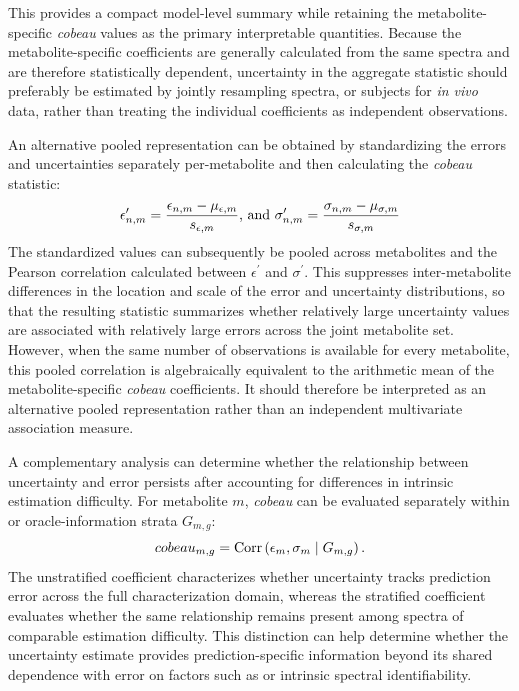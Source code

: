 This provides a compact model-level summary while retaining the metabolite-specific \textit{cobeau} values as the primary interpretable quantities. Because the metabolite-specific coefficients are generally calculated from the same spectra and are therefore statistically dependent, uncertainty in the aggregate statistic should preferably be estimated by jointly resampling spectra, or subjects for \textit{in vivo} data, rather than treating the individual coefficients as independent observations.

An alternative pooled representation can be obtained by standardizing the errors and uncertainties separately per-metabolite and then calculating the \textit{cobeau} statistic:
\begin{equation}\label{eqn:standardization for cobeau}
    \epsilon^\prime_{n,m} = \frac{\epsilon_{n,m} - \mu_{\epsilon,m}}{s_{\epsilon,m}}\textnormal{, and }
    \sigma^\prime_{n,m} = \frac{\sigma_{n,m} - \mu_{\sigma,m}}{s_{\sigma,m}}
\end{equation}
The standardized values can subsequently be pooled across metabolites and the Pearson correlation calculated between $\epsilon^\prime$ and $\sigma^\prime$. This suppresses inter-metabolite differences in the location and scale of the error and uncertainty distributions, so that the resulting statistic summarizes whether relatively large uncertainty values are associated with relatively large errors across the joint metabolite set. However, when the same number of observations is available for every metabolite, this pooled correlation is algebraically equivalent to the arithmetic mean of the metabolite-specific \textit{cobeau} coefficients. It should therefore be interpreted as an alternative pooled representation rather than an independent multivariate association measure.

A complementary analysis can determine whether the relationship between uncertainty and error persists after accounting for differences in intrinsic estimation difficulty. For metabolite $m$, \textit{cobeau} can be evaluated separately within \mSNR or oracle-information strata $G_{m,g}$:
\begin{equation}
    cobeau_{m,g} = \textnormal{Corr} \left( \epsilon_m, \sigma_m \mid G_{m,g} \right).
\end{equation}
The unstratified coefficient characterizes whether uncertainty tracks prediction error across the full characterization domain, whereas the stratified coefficient evaluates whether the same relationship remains present among spectra of comparable estimation difficulty. This distinction can help determine whether the uncertainty estimate provides prediction-specific information beyond its shared dependence with error on factors such as \SNR or intrinsic spectral identifiability.

